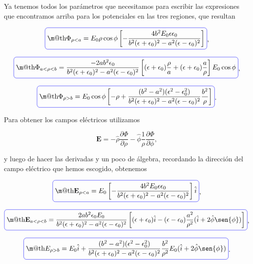\documentclass[a4paper,11pt]{article}
\makeatletter
\numberwithin{equation}{section}
\newcommand*{\boxcolor}{blue}
\renewcommand{\boxed}[1]{\textcolor{\boxcolor}{%
\tikz[baseline={([yshift=-1ex]current bounding box.center)}] \node [rectangle, minimum width=1ex,rounded corners,draw] {\normalcolor\m@th$\displaystyle#1$};}}
\makeatother
\begin{document}
Ya tenemos todos los parámetros que necesitamos para escribir las expresiones que 
encontramos arriba para los potenciales en las tres regiones, que resultan 

\begin{equation}
 \boxed{\Phi_{\rho < a} = E_0\rho\cos{\phi} \left[- \frac{4b^2 E_0 \epsilon
 \epsilon_0}{b^2(\epsilon + \epsilon_0)^2 
 - a^2(\epsilon - \epsilon_0)^2} \right]},
\end{equation}

\begin{equation}
 \boxed{\Phi_{a < \rho < b} = \frac{-2ab^2\epsilon_0}{b^2(\epsilon + \epsilon_0)^2 
 - a^2(\epsilon - \epsilon_0)^2}\left[(\epsilon + \epsilon_0)\frac{\rho}{a} 
 + (\epsilon + \epsilon_0)\frac{a}{\rho}\right]E_0\cos{\phi}},
\end{equation}

\begin{equation}
 \boxed{\Phi_{\rho>b} = E_0\cos{\phi}\left[-\rho + \frac{(b^2 - a^2)(\epsilon^2 -
 \epsilon_0^2)}{b^2(\epsilon +  \epsilon_0)^2 - a^2(\epsilon - \epsilon_0)^2} 
 \frac{b^2}{\rho}\right]}.
\end{equation}

Para obtener los campos eléctricos utilizamos

\begin{equation}
 \mathbf{E} = -\hat{\rho}\frac{\partial \Phi}{\partial \rho} 
 - \hat{\phi}\frac{1}{\rho}\frac{\partial \Phi}{\partial \phi},
\end{equation}

y luego de hacer las derivadas y un poco de álgebra, recordando la 
dirección del campo eléctrico que hemos escogido, obtenemos 

\begin{equation}
 \boxed{\mathbf{E}_{\rho < a} = E_0 \left[- \frac{4b^2 E_0 \epsilon
 \epsilon_0}{b^2(\epsilon + \epsilon_0)^2 
 - a^2(\epsilon - \epsilon_0)^2} \right]\hat{i}},
\end{equation}

\begin{equation}
 \boxed{\mathbf{E}_{a < \rho < b} = \frac{2ab^2\epsilon_0E_0}{b^2(\epsilon + \epsilon_0)^2 
 - a^2(\epsilon - \epsilon_0)^2}\left[(\epsilon + \epsilon_0)\hat{i}
 - (\epsilon - \epsilon_0)\frac{a^2}{\rho^2}(\hat{i} + 2\hat{\phi}\sen{\phi})\right]},
\end{equation}

\begin{equation}
 \boxed{E_{\rho > b} = E_0 \hat{i} + \frac{(b^2-a^2)(\epsilon^2 - \epsilon_0^2)}{
 b^2(\epsilon + \epsilon_0)^2 - a^2(\epsilon - \epsilon_0)^2}\frac{b^2}{\rho^2}
 E_0(\hat{i} + 2\hat{\phi}\sen{\phi})}.
\end{equation}
\end{document}
